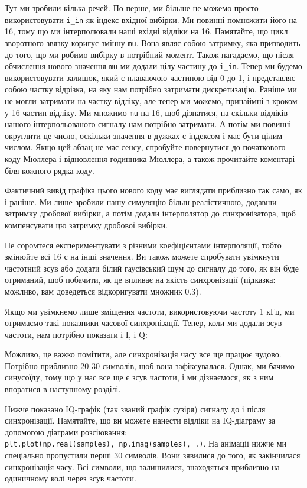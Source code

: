 Тут ми зробили кілька речей. По-перше, ми більше не можемо просто
використовувати \texttt{i\_in} як індекс вхідної вибірки. Ми повинні
помножити його на 16, тому що ми інтерполювали наші вхідні відліки на
16. Пам\textquotesingle ятайте, що цикл зворотного
зв\textquotesingle язку коригує змінну \texttt{mu}. Вона являє собою
затримку, яка призводить до того, що ми робимо вибірку в потрібний
момент. Також нагадаємо, що після обчислення нового значення \texttt{mu}
ми додали цілу частину до \texttt{i\_in}. Тепер ми будемо
використовувати залишок, який є плаваючою частиною від 0 до 1, і
представляє собою частку відрізка, на яку нам потрібно затримати
дискретизацію. Раніше ми не могли затримати на частку відліку, але тепер
ми можемо, принаймні з кроком у 16 частин відліку. Ми множимо
\texttt{mu} на 16, щоб дізнатися, на скільки відліків нашого
інтерпольованого сигналу нам потрібно затримати. А потім ми повинні
округлити це число, оскільки значення в дужках є індексом і має бути
цілим числом. Якщо цей абзац не має сенсу, спробуйте повернутися до
початкового коду Мюллера і відновлення годинника Мюллера, а також
прочитайте коментарі біля кожного рядка коду.

Фактичний вивід графіка цього нового коду має виглядати приблизно так
само, як і раніше. Ми лише зробили нашу симуляцію більш реалістичною,
додавши затримку дробової вибірки, а потім додали інтерполятор до
синхронізатора, щоб компенсувати цю затримку дробової вибірки.

Не соромтеся експериментувати з різними коефіцієнтами інтерполяції,
тобто змінюйте всі 16 с на інші значення. Ви також можете спробувати
увімкнути частотний зсув або додати білий гаусівський шум до сигналу до
того, як він буде отриманий, щоб побачити, як це впливає на якість
синхронізації (підказка: можливо, вам доведеться відкоригувати множник
0.3).

Якщо ми увімкнемо лише зміщення частоти, використовуючи частоту 1 кГц,
ми отримаємо такі показники часової синхронізації. Тепер, коли ми додали
зсув частоти, нам потрібно показати і I, і Q:

\href{../_images/time-sync-output2.svg}{}

Можливо, це важко помітити, але синхронізація часу все ще працює чудово.
Потрібно приблизно 20-30 символів, щоб вона зафіксувалася. Однак, ми
бачимо синусоїду, тому що у нас все ще є зсув частоти, і ми дізнаємося,
як з ним впоратися в наступному розділі.

Нижче показано IQ-графік (так званий графік сузір\textquotesingle я)
сигналу до і після синхронізації. Пам\textquotesingle ятайте, що ви
можете нанести відліки на IQ-діаграму за допомогою діаграми розсіювання:
\texttt{plt.plot(np.real(samples),\ np.imag(samples),\ \textquotesingle{}.\textquotesingle{})}.
На анімації нижче ми спеціально пропустили перші 30 символів. Вони
з\textquotesingle явилися до того, як закінчилася синхронізація часу.
Всі символи, що залишилися, знаходяться приблизно на одиничному колі
через зсув частоти.

